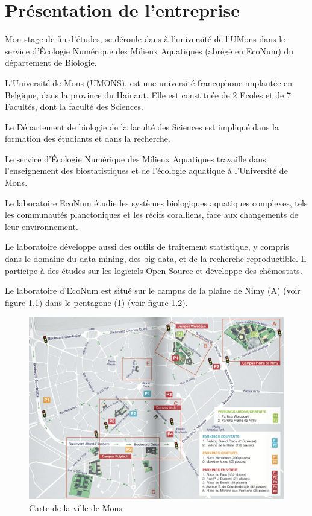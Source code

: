 \documentclass[]{article}
\title{}
\author{}
\date{}
\begin{document}
\section{Présentation de
l'entreprise}\label{presentation-de-lentreprise}

Mon stage de fin d'études, se déroule dans à l'université de l'UMons
dans le service d'Écologie Numérique des Milieux Aquatiques (abrégé en
EcoNum) du département de Biologie.

L'Université de Mons (UMONS), est une université francophone implantée
en Belgique, dans la province du Hainaut. Elle est constituée de 2
Ecoles et de 7 Facultés, dont la faculté des Sciences.

Le Département de biologie de la faculté des Sciences est impliqué dans
la formation des étudiants et dans la recherche.

Le service d'Écologie Numérique des Milieux Aquatiques travaille dans
l'enseignement des biostatistiques et de l'écologie aquatique à
l'Université de Mons.

Le laboratoire EcoNum étudie les systèmes biologiques aquatiques
complexes, tels les communautés planctoniques et les récifs coralliens,
face aux changements de leur environnement.

Le laboratoire développe aussi des outils de traitement statistique, y
compris dans le domaine du data mining, des big data, et de la recherche
reproductible. Il participe à des études sur les logiciels Open Source
et développe des chémostats.

Le laboratoire d'EcoNum est situé sur le campus de la plaine de Nimy (A)
(voir figure 1.1) dans le pentagone (1) (voir figure 1.2).

\begin{figure}
\centering
\includegraphics{../image/plan-campus.png}
\caption{Carte de la ville de Mons}
\end{figure}
\end{document}
